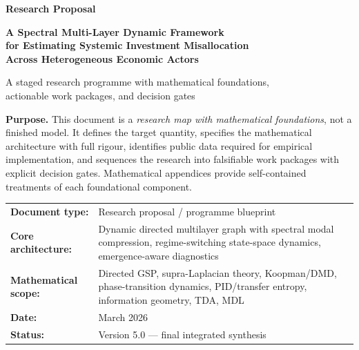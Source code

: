 \documentclass[11pt,a4paper]{article}
\theoremstyle{definition}
\begin{document}
\begin{titlepage}
\centering
\vspace*{1.5cm}
{\Large\bfseries\color{accent} Research Proposal\par}
\vspace{0.6cm}
{\LARGE\bfseries
  A Spectral Multi-Layer Dynamic Framework\\[6pt]
  for Estimating Systemic Investment Misallocation\\[6pt]
  Across Heterogeneous Economic Actors\par}
\vspace{0.8cm}
{\large A staged research programme with mathematical foundations,\\
actionable work packages, and decision gates\par}
\vspace{1.2cm}
\begin{keybox}
\textbf{Purpose.} This document is a \emph{research map with mathematical foundations}, not a finished model. It defines the target quantity, specifies the mathematical architecture with full rigour, identifies public data required for empirical implementation, and sequences the research into falsifiable work packages with explicit decision gates. Mathematical appendices provide self-contained treatments of each foundational component.
\end{keybox}
\vfill
\begin{tabular}{>{\bfseries}p{}p{}}
Document type: & Research proposal / programme blueprint \\
Core architecture: & Dynamic directed multilayer graph with spectral modal compression, regime-switching state-space dynamics, emergence-aware diagnostics \\
Mathematical scope: & Directed GSP, supra-Laplacian theory, Koopman/DMD, phase-transition dynamics, PID/transfer entropy, information geometry, TDA, MDL \\
Date: & March 2026 \\
Status: & Version 5.0 --- final integrated synthesis
\end{tabular}
\vspace*{1cm}
\end{titlepage}

\tableofcontents
\newpage
\end{document}

